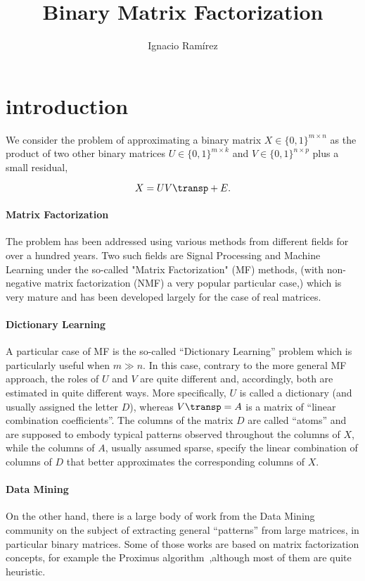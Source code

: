 \documentclass[a4paper,11pt]{article}
\title{Binary Matrix Factorization}\author{Ignacio Ram\'{i}rez}
\begin{document}
\maketitle

\section{introduction}

We consider the problem of approximating a binary matrix $X \in \{0,1\}^{m{\times}n}$ as the product of two other binary matrices $U \in \{0,1\}^{m{\times}k}$ and $V \in \{0,1\}^{n{\times}p}$ plus a small residual,

\begin{equation}
X = UV\transp + E.
\label{eq:mf}
\end{equation}

\paragraph{Matrix Factorization} The problem   has been addressed using various methods from different fields for over a hundred years. Two such fields are Signal Processing and Machine Learning under the so-called "Matrix Factorization" (MF) methods, (with non-negative matrix factorization (NMF) a very popular particular case,) which is very mature and has been developed largely for the case of real matrices.

\paragraph{Dictionary Learning} A particular case of MF is the so-called ``Dictionary Learning'' problem which is particularly useful when $m \gg n$. In this case, contrary to the more general MF approach, the roles of $U$ and $V$ are quite different and, accordingly, both are estimated in quite different ways. More specifically, $U$ is called a dictionary (and usually assigned the letter $D$), whereas $V\transp=A$ is a matrix of ``linear combination coefficients''. The columns of the matrix $D$ are called ``atoms'' and are supposed to embody typical patterns observed throughout the columns of $X$, while the columns of $A$, usually assumed sparse, specify the linear combination of columns of $D$ that better approximates the corresponding columns of $X$.

\paragraph{Data Mining} On the other hand, there is a large body of work from the Data Mining community on the subject of extracting general ``patterns'' from large matrices, in particular binary matrices. Some of those works are based on matrix factorization concepts, for example the Proximus algorithm~\cite{proximus},although most of them are quite heuristic.
\end{document}
